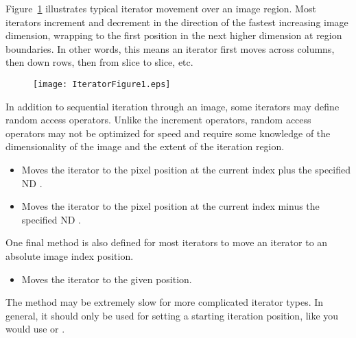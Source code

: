 Figure~\ref{fig:WalkingIterator} illustrates typical iterator movement over
an image region.  Most iterators increment and decrement in the direction of
the fastest increasing image dimension, wrapping to the first position in the
next higher dimension at region boundaries.  In other words, this means an
iterator first moves across columns, then down rows, then from slice to slice,
etc.

\begin{figure}
\centering
\texttt{[image: IteratorFigure1.eps]}
\protect\label{fig:WalkingIterator}
\end{figure}

In addition to sequential iteration through an image, some iterators may define
random access operators.  Unlike the increment operators, random access
operators may not be optimized for speed and require some knowledge of the
dimensionality of the image and the extent of the iteration region.  

\begin{itemize}
\item \textbf{} Moves the iterator to the pixel
position at the current index plus the specified ND . 

\item \textbf{} Moves the iterator to the pixel
position at the current index minus the specified ND .
\end{itemize}

One final method is also defined for most iterators to move an iterator to an
absolute image index position.

\begin{itemize}
\item \textbf{} Moves the iterator to the given
 position.
\end{itemize}

The  method may be extremely slow for more complicated
iterator types. In general, it should only be used for setting a starting
iteration position, like you would use  or .


